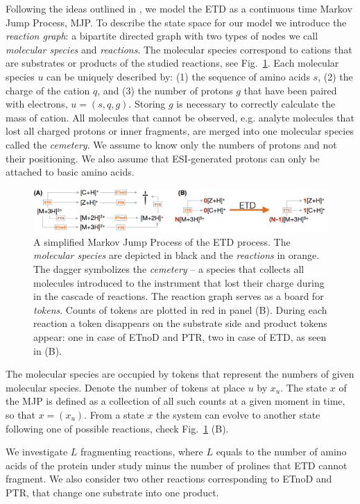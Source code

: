\documentclass{llncs}
\begin{document}
Following the ideas outlined in \cite{Gambin2010}, we model the ETD as a continuous time Markov Jump Process, MJP. To describe the state space for our model we introduce the \textit{reaction graph}: a bipartite directed graph with two types of nodes we call \textit{molecular species} and \textit{reactions}. The molecular species correspond to cations that are substrates or products of the studied reactions, see Fig.~\ref{img::petrinet}. Each molecular species $u$ can be uniquely described by: (1) the sequence of amino acids $s$, (2) the charge of the cation $q$, and (3) the number of protons $g$ that have been paired with electrons, $u = (s,q,g)$. Storing $g$ is necessary to correctly calculate the mass of cation. All molecules that cannot be observed, e.g. analyte molecules that lost all charged protons or inner fragments, are merged into one molecular species called the \textit{cemetery}. We assume to know only the numbers of protons and not their positioning. We also assume that ESI-generated protons can only be attached to basic amino acids.
\begin{figure}[h]
        \center
        \includegraphics[width=\textwidth]{petrinet.png}
        \caption{A simplified Markov Jump Process of the ETD process. The \textit{molecular species} are depicted in black and the \textit{reactions} in orange. The dagger symbolizes the \textit{cemetery} -- a species that collects all molecules introduced to the instrument that lost their charge during in the cascade of reactions. The reaction graph serves as a board for \textit{tokens}. Counts of tokens are plotted in red in panel (B). During each reaction a token disappears on the substrate side and product tokens appear: one in case of ETnoD and PTR, two in case of ETD, as seen in (B).}\label{img::petrinet}
\end{figure}

The molecular species are occupied by tokens that represent the numbers of given molecular species. Denote the number of tokens at place $u$ by $x_u$. The state $x$ of the MJP is defined as a collection of all such counts at a given moment in time, so that $x = (x_u)$.  From a state $x$ the system can evolve to another state following one of possible reactions, check Fig.~\ref{img::petrinet} (B).

We investigate $L$ fragmenting reactions, where $L$ equals to the number of amino acids of the protein under study minus the number of prolines that ETD cannot fragment. We also consider two other reactions corresponding to ETnoD and PTR, that change one substrate into one product.
\end{document}
